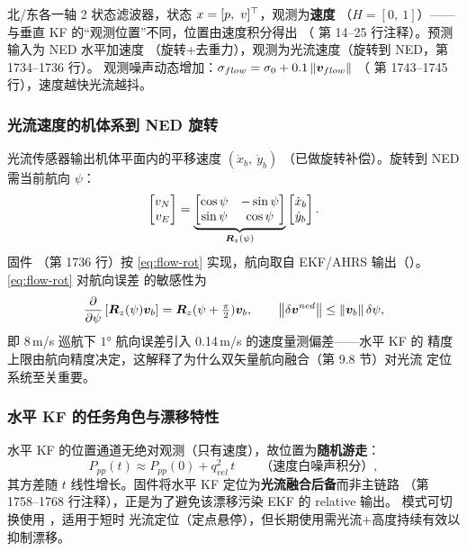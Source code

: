 北/东各一轴 2 状态滤波器，状态 $x = [p,\ v]\T$，观测为\textbf{速度}
（$H = [0,\ 1]$）——与垂直 KF 的``观测位置''不同，位置由速度积分得出
（ 第 14--25 行注释）。预测输入为 NED 水平加速度
（旋转+去重力），观测为光流速度（旋转到 NED，第 1734--1736 行）。
观测噪声动态增加：$\sigma_{flow} = \sigma_0 + 0.1\,\|\boldsymbol{v}_{flow}\|$
（ 第 1743--1745 行），速度越快光流越抖。

\subsubsection{光流速度的机体系到 NED 旋转}

光流传感器输出机体平面内的平移速度 $(\dot{x}_b,\ \dot{y}_b)$
（已做旋转补偿）。旋转到 NED 需当前航向 $\psi$：
\begin{equation}
  \begin{bmatrix} v_N \\ v_E \end{bmatrix}
  = \underbrace{\begin{bmatrix} \cos\psi & -\sin\psi \\
      \sin\psi & \cos\psi \end{bmatrix}}_{\boldsymbol{R}_z(\psi)}
    \begin{bmatrix} \dot{x}_b \\ \dot{y}_b \end{bmatrix}.
  \label{eq:flow-rot}
\end{equation}
固件 （第 1736 行）按 \cref{eq:flow-rot} 实现，航向取自
EKF/AHRS 输出（）。\cref{eq:flow-rot} 对航向误差
的敏感性为
\begin{equation}
  \frac{\partial}{\partial\psi}\left[\boldsymbol{R}_z(\psi)\boldsymbol{v}_b\right]
  = \boldsymbol{R}_z(\psi + \tfrac{\pi}{2})\boldsymbol{v}_b,
  \qquad
  \left\|\delta\boldsymbol{v}^{ned}\right\| \le \|\boldsymbol{v}_b\|\,\delta\psi,
  \label{eq:flow-yaw-sens}
\end{equation}
即 8\,m/s 巡航下 $1°$ 航向误差引入 0.14\,m/s 的速度量测偏差——水平 KF 的
精度上限由航向精度决定，这解释了为什么双矢量航向融合（第 9.8 节）对光流
定位系统至关重要。

\subsubsection{水平 KF 的任务角色与漂移特性}

水平 KF 的位置通道无绝对观测（只有速度），故位置为\textbf{随机游走}：
\begin{equation}
  P_{pp}(t) \approx P_{pp}(0) + q_{vel}^2\,t
  \qquad\text{（速度白噪声积分）},
  \label{eq:hkf-drift}
\end{equation}
其方差随 $t$ 线性增长。固件将水平 KF 定位为\textbf{光流融合后备}而非主链路
（第 1758--1768 行注释），正是为了避免该漂移污染 EKF 的 relative 输出。
 模式可切换使用 ，适用于短时
光流定位（定点悬停），但长期使用需光流+高度持续有效以抑制漂移。

